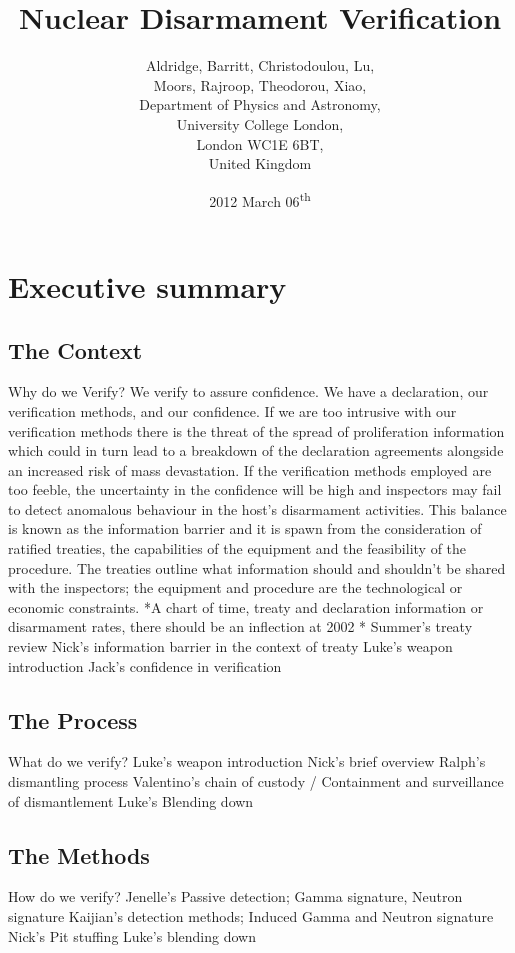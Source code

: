 \documentclass[a4paper]{article}
\begin{document}
\title{Nuclear Disarmament Verification}
\author{Aldridge, Barritt, Christodoulou, Lu, \\
	Moors, Rajroop, Theodorou, Xiao, \\
	Department of Physics and Astronomy, \\
	University College London, \\
	London WC1E 6BT, \\
	United Kingdom}
\date{2012 March 06\textsuperscript{th}}
\maketitle

\section*{Executive summary}
\subsection*{The Context}
  Why do we Verify?
We verify to assure confidence. We have a declaration, our verification methods, and our confidence. If we are too intrusive with our verification methods there is the threat of the spread of proliferation information which could in turn lead to a breakdown of the declaration agreements alongside an increased risk of mass devastation. If the verification methods employed are too feeble, the uncertainty in the confidence will be high and inspectors may fail to detect anomalous behaviour in the host’s disarmament activities.
This balance is known as the information barrier and it is spawn from the consideration of ratified treaties, the capabilities of the equipment and the feasibility of the procedure. The treaties outline what information should and shouldn’t be shared with the inspectors; the equipment and procedure are the technological or economic constraints.
*A chart of time, treaty and declaration information or disarmament rates, there should be an inflection at 2002 *
Summer’s treaty review
Nick’s information barrier in the context of treaty
Luke’s weapon introduction
Jack’s confidence in verification
\subsection*{The Process}
	What do we verify?
Luke’s weapon introduction
Nick’s brief overview 
Ralph’s dismantling process
Valentino’s chain of custody / Containment and surveillance of dismantlement 
Luke’s Blending down
\subsection*{The Methods}
	How do we verify?
Jenelle’s Passive detection; Gamma signature, Neutron signature
Kaijian’s detection methods; Induced Gamma and Neutron signature 
Nick’s Pit stuffing
Luke’s blending down
\end{document}
